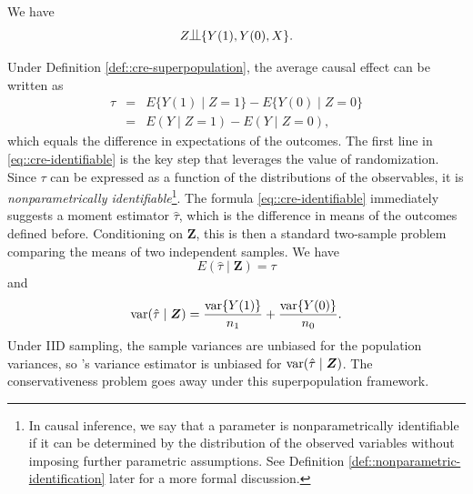 \begin{definition}
\label{def::cre-superpopulation}
We have
$$
Z \ind \{  Y(1), Y(0), X \} .
$$
\end{definition}

Under Definition \ref{def::cre-superpopulation}, the average causal effect can be written as
\begin{eqnarray}
\tau &=& E\{  Y(1) \mid Z=1\}  - E\{  Y(0) \mid Z=0 \}   \nonumber  \\
&=& E( Y \mid Z=1)  - E(  Y \mid Z=0 ),
\label{eq::cre-identifiable}
\end{eqnarray}
which equals the difference in expectations of the outcomes. The first line in \eqref{eq::cre-identifiable} is the key step that leverages the value of randomization.  Since  $\tau  $ can be expressed as a function of the distributions of the observables, it is {\it nonparametrically identifiable}\footnote{In causal inference, we say that a parameter is nonparametrically identifiable if it can be determined by the distribution of the observed variables without imposing further parametric assumptions. See Definition \ref{def::nonparametric-identification} later for a more formal discussion.}. The formula \eqref{eq::cre-identifiable} immediately suggests a moment estimator $\hat{\tau}$, which is the difference in means of the outcomes defined before. Conditioning on $\bm{Z}$, this is then a standard two-sample problem comparing the means of two independent samples. We have
$$
E(  \hat{\tau} \mid \bm{Z}) = \tau
$$
and
$$
\textup{var} (  \hat{\tau} \mid \bm{Z}) =   \frac{ \textup{var}\{ Y(1) \}}{n_1} + \frac{ \textup{var}\{ Y(0) \}}{n_0}.
$$
Under IID sampling, the sample variances are unbiased for the population variances, so \citet{Neyman:1923}'s variance estimator is unbiased for $\textup{var} (  \hat{\tau} \mid \bm{Z}) $. The conservativeness problem goes away under this superpopulation framework.


